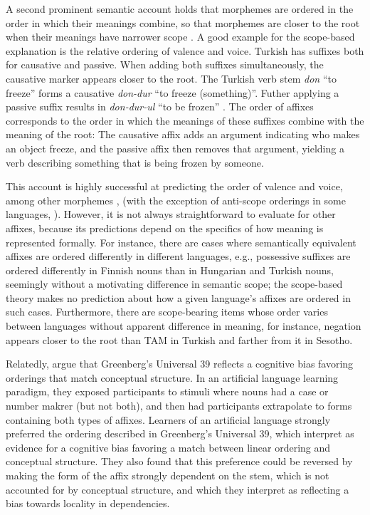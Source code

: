 \documentclass[man]{apa7}
\newcommand{\citep}{\parencite}
\newcommand{\citet}{\Textcite}
\begin{document}
A second prominent semantic account holds that morphemes are ordered in the order in which their meanings combine, so that morphemes are closer to the root when their meanings have narrower scope \citep[e.g.,][]{rice2000morpheme, caballero2010scope,  narrog2010the, korotkova2010deriving}.
A good example for the scope-based explanation is the relative ordering of valence and voice.
Turkish has suffixes both for causative and passive.
When adding both suffixes simultaneously, the causative marker appears closer to the root.
The Turkish verb stem \textit{don} ``to freeze'' forms a causative \textit{don-dur} ``to freeze (something)''.
Futher applying a passive suffix results in \textit{don-dur-ul} ``to be frozen'' \citep[][Section 30.8.2]{schaaik2020turkish}.
The order of affixes corresponds to the order in which the meanings of these suffixes combine with the meaning of the root:
The causative affix adds an argument indicating who makes an object freeze, and the passive affix then removes that argument, yielding a verb describing something that is being frozen by someone.


This account is highly successful at predicting the order of valence and voice, among other morphemes \citep[e.g.,][]{rice2000morpheme, caballero2010scope,  narrog2010the, korotkova2010deriving}, (with the exception of anti-scope orderings in some languages, \citep{hyman2003suffix}).
However, it is not always straightforward to evaluate for other affixes, because its predictions depend on the specifics of how meaning is represented formally.
For instance, there are cases where semantically equivalent affixes are ordered differently in different languages, e.g., possessive suffixes are ordered differently in Finnish nouns than in Hungarian and Turkish nouns, seemingly without a motivating difference in semantic scope; the scope-based theory makes no prediction about how a given language's affixes are ordered in such cases.
Furthermore, there are scope-bearing items whose order varies between languages without apparent difference in meaning, for instance, negation appears closer to the root than TAM in Turkish and farther from it in Sesotho.

Relatedly, \citet{saldana2021cross} argue that Greenberg's Universal 39 reflects a cognitive bias favoring orderings that match conceptual structure.
In an artificial language learning paradigm, they exposed participants to stimuli where nouns had a case or number makrer (but not both), and then had participants extrapolate to forms containing both types of affixes.
Learners of an artificial language strongly preferred the ordering described in Greenberg's Universal 39, which \citet{saldana2021cross} interpret as evidence for a cognitive bias favoring a match between linear ordering and conceptual structure.
They also found that this preference could be reversed by making the form of the affix strongly dependent on the stem, which is not accounted for by conceptual structure, and which they interpret as reflecting a bias towards locality in dependencies.
\end{document}

